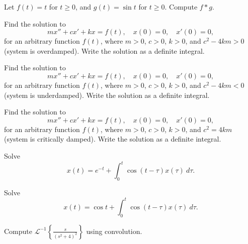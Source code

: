 \begin{exercise}
Let $f(t) = t$ for $t \geq 0$, and $g(t) = \sin t $ for $t \geq 0$.  Compute
$f * g$.
\end{exercise}

\begin{exercise}
Find the solution to
\begin{equation*}
m x'' + c x' + k x = f(t) , \quad x(0) = 0, \quad x'(0) = 0 ,
\end{equation*}
for an arbitrary function $f(t)$, where $m > 0$, $c > 0$, $k > 0$,
and $c^2 - 4km > 0$ (system is overdamped).
Write the solution as a definite integral.
\end{exercise}

\begin{exercise}
Find the solution to
\begin{equation*}
m x'' + c x' + k x = f(t) , \quad x(0) = 0, \quad x'(0) = 0 ,
\end{equation*}
for an arbitrary function $f(t)$, where $m > 0$, $c > 0$, $k > 0$,
and $c^2 - 4km < 0$ (system is underdamped).
Write the solution as a definite integral.
\end{exercise}

\begin{exercise}
Find the solution to
\begin{equation*}
m x'' + c x' + k x = f(t) , \quad x(0) = 0, \quad x'(0) = 0 ,
\end{equation*}
for an arbitrary function $f(t)$, where $m > 0$, $c > 0$, $k > 0$,
and $c^2 = 4km$ (system is critically damped).
Write the solution as a definite integral.
\end{exercise}

\begin{exercise}
Solve
\begin{equation*}
x(t) =  e^{-t} + \int_0^t \cos(t-\tau) x(\tau) ~ d\tau .
\end{equation*}
\end{exercise}

\begin{exercise}
Solve
\begin{equation*}
x(t) =  \cos t + \int_0^t \cos(t-\tau) x(\tau) ~ d\tau .
\end{equation*}
\end{exercise}

\begin{exercise}
Compute ${\mathcal{L}}^{-1} \left\{ \frac{s}{{(s^2+4)}^2} \right\}$ using
convolution.
\end{exercise}

